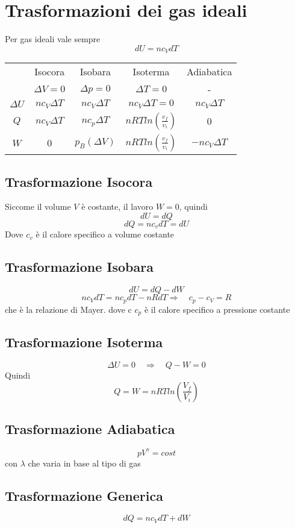 \documentclass[a4paper]{report}
\begin{document}
  \section{Trasformazioni dei gas ideali}
  Per gas ideali vale sempre
  \[ dU = n c_V dT \]
  \begin{center}
  \begin{tabular}{ |c|c|c|c|c| }
   \hline
    & Isocora & Isobara & Isoterma & Adiabatica \\
    & $\Delta V = 0$ & $\Delta p = 0$ & $\Delta T = 0$ & -\\
   \hline
   $\Delta U$ & $n c_V \Delta T$ & $n c_V \Delta T$ & $n c_V \Delta T = 0$ & $n c_V \Delta T$ \\
   $Q$ & $n c_V \Delta T$ & $n c_p \Delta T$ & $nR T ln(\frac{v_f}{v_i})$ & $0$\\
   $W$ & $0$ & $p_B(\Delta V)$ & $nR T ln(\frac{v_f}{v_i})$ & $-n c_V \Delta T$ \\
   \hline
  \end{tabular}
  \end{center}
  \subsection{Trasformazione Isocora}
  Siccome il volume $V$ è costante, il lavoro $W = 0$, quindi
  \[ dU=dQ \]
  \[ dQ = nc_vdT = dU\]
  Dove $c_v$ è il calore specifico a volume costante
  \subsection{Trasformazione Isobara}
  \[ dU = dQ-dW \]
  \[ n c_V dT = n c_p dT - nR dT \Rightarrow \quad c_p -c_V = R \]
  che è la relazione di Mayer. dove c $c_p$ è il calore specifico a pressione costante
  \subsection{Trasformazione Isoterma}
  \[ \Delta U = 0 \quad \Rightarrow \quad Q-W =0 \]
  Quindi
  \[ Q = W = n R T ln(\frac{V_f}{V_i}) \]
  \subsection{Trasformazione Adiabatica}
  \[ p V^{\gamma} = cost \]
  con $\lambda$ che varia in base al tipo di gas
  \subsection{Trasformazione Generica}
  \[ dQ = nc_V dT + dW \]
\end{document}
